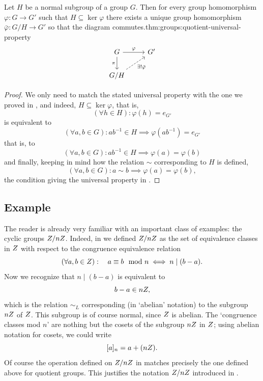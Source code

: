 \begin{thm}{Let $H$ be a normal subgroup of a group $G$. Then for
    every group homomorphism $\varphi : G \to G'$ such that
    $H \subseteq \ker\varphi$ there exists a unique group homomorphism
    $\bar\varphi : G/H \to G'$ so that the diagram
    commutes.}{thm:groups:quotient-universal-property}
  \[
    \begin{tikzcd}
      G \arrow[r, "\varphi"] \arrow[d, "\pi"'] & G' \\
      G/H \arrow[ur, dashed, "\exists ! \bar\varphi"'] &
    \end{tikzcd}
  \]
\end{thm}
\begin{proof}
  We only need to match the stated universal property with the one we
  proved in
  , and
  indeed, $H \subseteq \ker\varphi$, that is,
  \[
    (\forall h \in H) : \varphi(h) =
    e_{G'}
  \]
  is equivalent to
  \[
    (\forall a, b \in G) : ab^{-1} \in H \implies \varphi(ab^{-1}) =
    e_{G'}
  \]
  that is, to
  \[
    (\forall a, b \in G) : ab^{-1} \in H \implies \varphi(a) =
    \varphi(b)
  \]
  and finally, keeping in mind how the relation $\sim$ corresponding
  to $H$ is defined,
  \[
    (\forall a, b \in G) : a \sim b \implies \varphi(a) = \varphi(b),
  \]
  the condition giving the universal property in
  .
\end{proof}

\subsection{Example}
\label{subsec:groups:example}
The reader is already very familiar with an important class of
examples: the cyclic groups $Z/nZ$. Indeed, in
 we
defined $Z/nZ$ as the set of equivalence classes in $Z$ with
respect to the congruence equivalence relation
\[
  (\forall a, b \in Z) : \quad a \equiv b \mod n \iff n \mid (b-a).
\]
Now we recognize that $n \mid (b-a)$ is equivalent to
\[
  b - a \in nZ,
\]
which is the relation $\sim_L$ corresponding (in `abelian' notation)
to the subgroup $nZ$ of $Z$. This subgroup is of course normal,
since $Z$ is abelian. The `congruence classes mod $n$' are nothing
but the cosets of the subgroup $nZ$ in $Z$; using abelian notation
for cosets, we could write
\[ [a]_n = a + (nZ).
\]
Of course the operation defined on $Z/nZ$ in
 matches
precisely the one defined above for quotient groups. This justifies
the notation $Z/nZ$ introduced in
.


